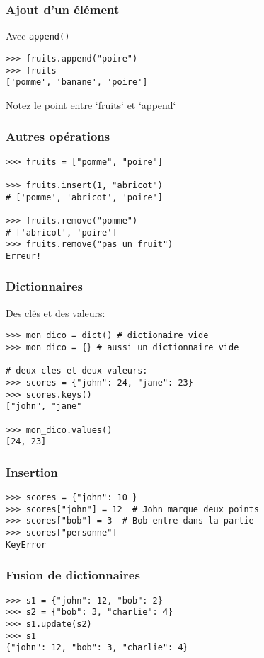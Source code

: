 \documentclass{beamer}
\begin{document}
\begin{frame}[fragile]
  \frametitle{Ajout d'un élément}
Avec \texttt{append()}

\begin{lstlisting}
>>> fruits.append("poire")
>>> fruits
['pomme', 'banane', 'poire']
\end{lstlisting}

\vfill

Notez le point entre `fruits` et `append`
\end{frame}


\begin{frame}[fragile]
  \frametitle{Autres opérations}

\begin{lstlisting}
>>> fruits = ["pomme", "poire"]

>>> fruits.insert(1, "abricot")
# ['pomme', 'abricot', 'poire']

>>> fruits.remove("pomme")
# ['abricot', 'poire']
>>> fruits.remove("pas un fruit")
Erreur!
\end{lstlisting}

\end{frame}



\begin{frame}[fragile]
  \frametitle{Dictionnaires}

Des clés et des valeurs:

\begin{lstlisting}
>>> mon_dico = dict() # dictionaire vide
>>> mon_dico = {} # aussi un dictionnaire vide

# deux cles et deux valeurs:
>>> scores = {"john": 24, "jane": 23}
>>> scores.keys()
["john", "jane"

>>> mon_dico.values()
[24, 23]
\end{lstlisting}

\end{frame}

\begin{frame}[fragile]
  \frametitle{Insertion}
\begin{lstlisting}
>>> scores = {"john": 10 }
>>> scores["john"] = 12  # John marque deux points
>>> scores["bob"] = 3  # Bob entre dans la partie
>>> scores["personne"]
KeyError
\end{lstlisting}
\end{frame}

\begin{frame}[fragile]
  \frametitle{Fusion de dictionnaires}

\begin{lstlisting}
>>> s1 = {"john": 12, "bob": 2}
>>> s2 = {"bob": 3, "charlie": 4}
>>> s1.update(s2)
>>> s1
{"john": 12, "bob": 3, "charlie": 4}
\end{lstlisting}
\end{frame}
\end{document}
